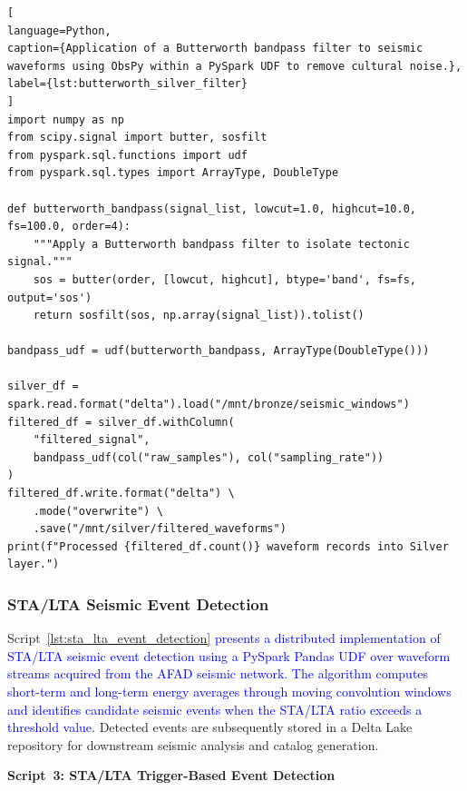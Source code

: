 \documentclass[data,article,submit,pdftex,moreauthors]{Definitions/mdpi}
\begin{document}
\begin{lstlisting}[
language=Python,
caption={Application of a Butterworth bandpass filter to seismic waveforms using ObsPy within a PySpark UDF to remove cultural noise.},
label={lst:butterworth_silver_filter}
]
import numpy as np
from scipy.signal import butter, sosfilt
from pyspark.sql.functions import udf
from pyspark.sql.types import ArrayType, DoubleType

def butterworth_bandpass(signal_list, lowcut=1.0, highcut=10.0, fs=100.0, order=4):
    """Apply a Butterworth bandpass filter to isolate tectonic signal."""
    sos = butter(order, [lowcut, highcut], btype='band', fs=fs, output='sos')
    return sosfilt(sos, np.array(signal_list)).tolist()

bandpass_udf = udf(butterworth_bandpass, ArrayType(DoubleType()))

silver_df = spark.read.format("delta").load("/mnt/bronze/seismic_windows")
filtered_df = silver_df.withColumn(
    "filtered_signal",
    bandpass_udf(col("raw_samples"), col("sampling_rate"))
)
filtered_df.write.format("delta") \
    .mode("overwrite") \
    .save("/mnt/silver/filtered_waveforms")
print(f"Processed {filtered_df.count()} waveform records into Silver layer.")
\end{lstlisting}

\subsubsection{STA/LTA Seismic Event Detection}

Script~\ref{lst:sta_lta_event_detection} \textcolor{blue}{presents a distributed implementation of STA/LTA seismic event detection using a PySpark Pandas UDF over waveform streams acquired from the AFAD seismic network. The algorithm computes short-term and long-term energy averages through moving convolution windows and identifies candidate seismic events when the STA/LTA ratio exceeds a threshold value}. Detected events are subsequently stored in a Delta Lake repository for downstream seismic analysis and catalog generation.

\textbf{Script~3: STA/LTA Trigger-Based Event Detection}
\end{document}

